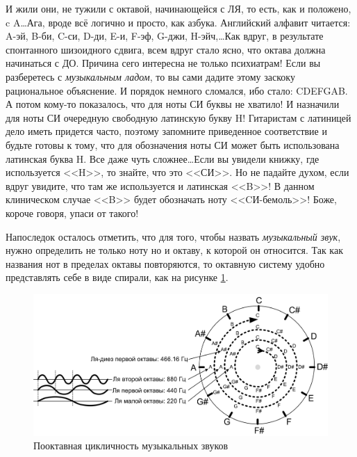 \begin{Example}
    И жили они, не тужили с октавой, начинающейся с ЛЯ, то есть, как и положено, c A\ldots Ага, вроде всё логично и просто, как азбука. Английский алфавит читается: A-эй, B-би, C-си, D-ди, E-и, F-эф, G-джи, H-эйч,\ldots Как вдруг, в результате спонтанного шизоидного сдвига, всем вдруг стало ясно, что октава должна начинаться с ДО. Причина сего интересна не только психиатрам! Если вы разберетесь с \emph{музыкальным ладом}, то вы сами дадите этому заскоку рациональное объяснение. И порядок немного сломался, ибо стало: CDEFGAB. А потом кому-то показалось, что для ноты СИ буквы не хватило! И назначили для ноты СИ очередную свободную латинскую букву H! Гитаристам с латиницей дело иметь придется часто, поэтому запомните приведенное соответствие и будьте готовы к тому, что для обозначения ноты СИ может быть использована латинская буква H. Все даже чуть сложнее\ldots Если вы увидели книжку, где используется <<H>>, то знайте, что это <<СИ>>. Но не падайте духом, если вдруг увидите, что там же используется и латинская <<B>>! В данном клиническом случае <<B>> будет обозначать ноту <<CИ-бемоль>>! Боже, короче говоря, упаси от такого!
\end{Example}

Напоследок осталось отметить, что для того, чтобы назвать \emph{музыкальный звук}, нужно определить не только ноту но и октаву, к которой он относится. Так как названия нот в пределах октавы повторяются, то октавную систему удобно представлять себе в виде спирали, как на рисунке \ref{fig:notes:names:octave}.

\begin{figure}[!ht]
    \centering
    \includegraphics{fig/intervals/octave-spiral} 
    \caption{Пооктавная цикличность музыкальных звуков}\label{fig:notes:names:octave}
\end{figure} 

